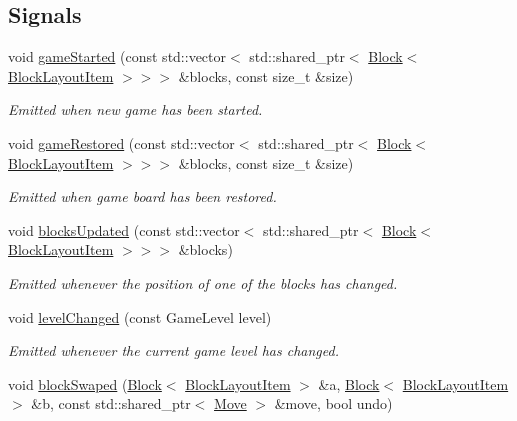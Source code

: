 \subsection*{Signals}
\begin{DoxyCompactItemize}
\item 
void \mbox{\hyperlink{class_blocks_model_ad4beaf1054214a1688033489a0817a8b}{game\+Started}} (const std\+::vector$<$ std\+::shared\+\_\+ptr$<$ \mbox{\hyperlink{class_block}{Block}}$<$ \mbox{\hyperlink{class_block_layout_item}{Block\+Layout\+Item}} $>$$>$$>$ \&blocks, const size\+\_\+t \&size)
\begin{DoxyCompactList}\small\item\em Emitted when new game has been started. \end{DoxyCompactList}\item 
void \mbox{\hyperlink{class_blocks_model_a1b26e86f148e270ac598aa24accc718b}{game\+Restored}} (const std\+::vector$<$ std\+::shared\+\_\+ptr$<$ \mbox{\hyperlink{class_block}{Block}}$<$ \mbox{\hyperlink{class_block_layout_item}{Block\+Layout\+Item}} $>$$>$$>$ \&blocks, const size\+\_\+t \&size)
\begin{DoxyCompactList}\small\item\em Emitted when game board has been restored. \end{DoxyCompactList}\item 
void \mbox{\hyperlink{class_blocks_model_ab2870995b5c7936d0e0f7afe41e7fbeb}{blocks\+Updated}} (const std\+::vector$<$ std\+::shared\+\_\+ptr$<$ \mbox{\hyperlink{class_block}{Block}}$<$ \mbox{\hyperlink{class_block_layout_item}{Block\+Layout\+Item}} $>$$>$$>$ \&blocks)
\begin{DoxyCompactList}\small\item\em Emitted whenever the position of one of the blocks has changed. \end{DoxyCompactList}\item 
void \mbox{\hyperlink{class_blocks_model_aadc67f8541695e398bd80f66690308c4}{level\+Changed}} (const Game\+Level level)
\begin{DoxyCompactList}\small\item\em Emitted whenever the current game level has changed. \end{DoxyCompactList}\item 
void \mbox{\hyperlink{class_blocks_model_a7fb837fa85f6de3b9e3bc56a590f734e}{block\+Swaped}} (\mbox{\hyperlink{class_block}{Block}}$<$ \mbox{\hyperlink{class_block_layout_item}{Block\+Layout\+Item}} $>$ \&a, \mbox{\hyperlink{class_block}{Block}}$<$ \mbox{\hyperlink{class_block_layout_item}{Block\+Layout\+Item}} $>$ \&b, const std\+::shared\+\_\+ptr$<$ \mbox{\hyperlink{struct_move}{Move}} $>$ \&move, bool undo)

\end{DoxyCompactItemize}
